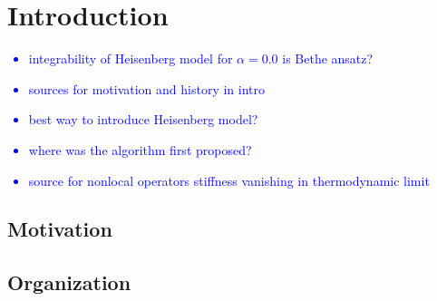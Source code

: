 \chapter{Introduction}
\thispagestyle{chapterBeginStyle}

\textcolor{blue}{
    \begin{itemize}
        \item integrability of Heisenberg model for \(\alpha = 0.0 \) is Bethe ansatz?
        \item sources for motivation and history in intro
        \item best way to introduce Heisenberg model?
        \item where was the algorithm first proposed?
        \item source for nonlocal operators stiffness vanishing in thermodynamic limit
    \end{itemize}
}


\section{Motivation}

\section{Organization}
